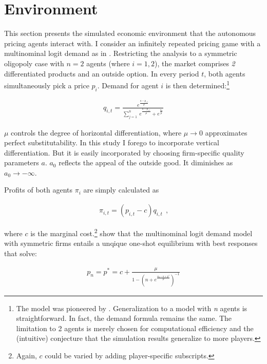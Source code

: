\section{Environment}\label{enironment}

This section presents the simulated economic environment that the autonomous pricing agents interact with. I consider an infinitely repeated pricing game with a multinominal logit demand as in \textcite{calvano_artificial_2020}. Restricting the analysis to a symmetric oligopoly case with $n=2$ agents (where $i = 1,2$), the market comprises \emph{2} differentiated products and an outside option. In every period $t$, both agents simultaneously pick a price $p_i$. Demand for agent $i$ is then determined:\footnote{The model was pioneered by \textcite{anderson_logit_1992}. Generalization to a model with \emph{n} agents is straightforward. In fact, the demand formula remains the same. The limitation to 2 agents is merely chosen for computational efficiency and the (intuitive) conjecture that the simulation results generalize to more players.}

\begin{gather}\label{quantity}
q_{i,t}=\frac{e^{\frac{a - p_{i,t}}{\mu}}}{\sum_{j=1}^{n}~ e^{\frac{a-p_{j,t}}{\mu}}+e^{\frac{a_0}{\mu}}}
\end{gather}

$\mu$ controls the degree of horizontal differentiation, where $\mu \rightarrow 0$ approximates perfect substitutability. In this study I forego to incorporate vertical differentiation. But it is easily incorporated by choosing firm-specific quality parameters $a$. $a_0$ reflects the appeal of the outside good. It diminishes as $a_0 \rightarrow -\infty$. 

Profits of both agents $\pi_i$ are simply calculated as

\begin{gather}\label{profit}
\pi_{i,t} = (p_{i,t} - c) q_{i,t} ~~ \text{,}
\end{gather}

where $c$ is the marginal cost.\footnote{Again, $c$ could be varied by adding player-specific subscripts.} \textcite{anderson_logit_1992} show that the multinominal logit demand model with symmetric firms entails a unqique one-shot equilibrium with best responses that solve:

\begin{gather}\label{best_response}
	p_n = p^* = c + \frac{\mu}{1 - (n + e^{\frac{a_0 - a + p^*}{\mu}})^{-1}}
\end{gather}

